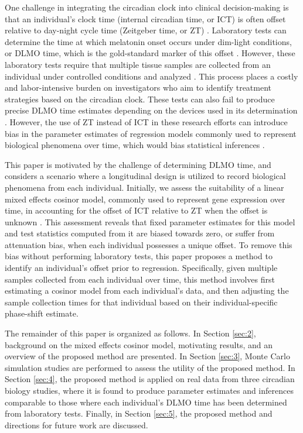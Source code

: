 One challenge in integrating the circadian clock into clinical decision-making is that an individual's clock time (internal circadian time, or ICT) is often offset relative to day-night cycle time (Zeitgeber time, or ZT) \citep{Duffy2011, Lewy1999, Wittenbrink2018}. Laboratory tests can determine the time at which melatonin onset occurs under dim-light conditions, or DLMO time, which is the gold-standard marker of this offset \citep{Hughey2017, Kennaway2023, Lewy1999, Ruiz2020, Wittenbrink2018}. However, these laboratory tests require that multiple tissue samples are collected from an individual under controlled conditions and analyzed \citep{Kantermann2015, Kennaway2019, Kennaway2020, Reid2019}. This process places a costly and labor-intensive burden on investigators who aim to identify treatment strategies based on the circadian clock. These tests can also fail to produce precise DLMO time estimates depending on the devices used in its determination \citep{Kennaway2019, Kennaway2020}. However, the use of ZT instead of ICT in these research efforts can introduce bias in the parameter estimates of regression models commonly used to represent biological phenomena over time, which would bias statistical inferences \citep{Gorczyca2023, Gorczyca2024, Sollberger1962, Weaver1995}.

This paper is motivated by the challenge of determining DLMO time, and considers a scenario where a longitudinal design is utilized to record biological phenomena from each individual. Initially, we assess the suitability of a linear mixed effects cosinor model, commonly used to represent gene expression over time, in accounting for the offset of ICT relative to ZT when the offset is unknown \citep{Archer2014, delolmo2022, Fontana2012, Hou2021, MllerLevet2013}. This assessment reveals that fixed parameter estimates for this model and test statistics computed from it are biased towards zero, or suffer from attenuation bias, when each individual possesses a unique offset. To remove this bias without performing laboratory tests, this paper proposes a method to identify an individual's offset prior to regression. Specifically, given multiple samples collected from each individual over time, this method involves first estimating a cosinor model from each individual's data, and then adjusting the sample collection times for that individual based on their individual-specific phase-shift estimate. 

The remainder of this paper is organized as follows. In Section \ref{sec:2}, background on the mixed effects cosinor model, motivating results, and an overview of the proposed method are presented. In Section \ref{sec:3}, Monte Carlo simulation studies are performed to assess the utility of the proposed method. In Section \ref{sec:4}, the proposed method is applied on real data from three circadian biology studies, where it is found to produce parameter estimates and inferences comparable to those where each individual's DLMO time has been determined from laboratory tests. Finally, in Section \ref{sec:5}, the proposed method and directions for future work are discussed.

